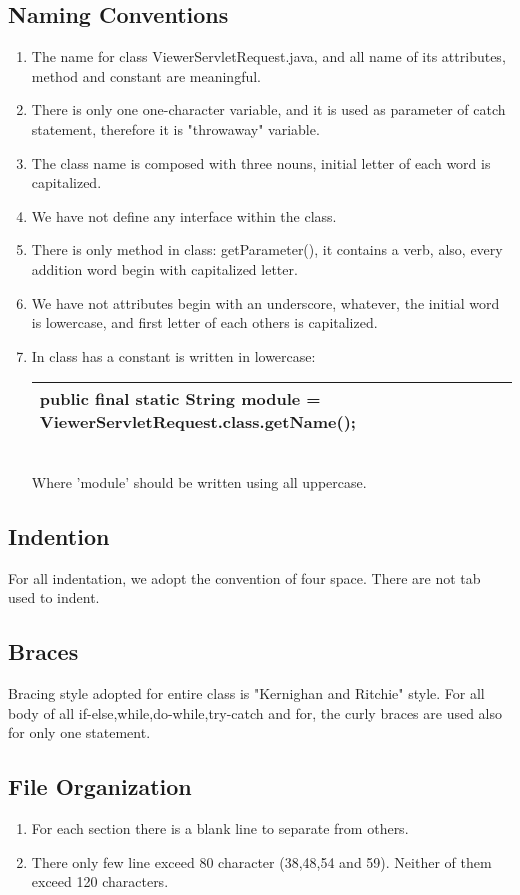 \documentclass{article}
\begin{document}
\subsection{Naming Conventions}
\begin{enumerate}
\item 
The name for class ViewerServletRequest.java, and all name of its attributes, method and constant are meaningful.
\item
There is only one one-character variable, and it is used as parameter of catch statement, therefore it is "throwaway" variable.
\item
The class name is composed with three nouns, initial letter of each word is capitalized.
\item
We have not define any interface within the class.
\item 
There is only method in class: getParameter(), it contains a verb, also, every addition word begin with capitalized letter.
\item
We have not attributes begin with an underscore, whatever, the initial word is lowercase, and first letter of each others is capitalized.
\item
In class has a constant is written in lowercase:
\begin{table}[hpb]
\label{my-label}
\begin{tabular}{|l|}
\hline
public final static String module = ViewerServletRequest.class.getName();\\
\hline
\end{tabular}
\end{table} 
\\Where 'module' should be written using all uppercase.
\end{enumerate}

\subsection{Indention}
For all indentation, we adopt the convention of four space. There are not tab used to indent. 
\subsection{Braces}
Bracing style adopted for entire class is "Kernighan and Ritchie" style. For all body of all if-else,while,do-while,try-catch and for, the curly braces are used also for only one statement.
\subsection{File Organization}
\begin{enumerate}
\item
For each section there is a blank line to separate from others.
\item
There only few line exceed 80 character (38,48,54 and 59). Neither of them exceed 120 characters.
\end{enumerate}
\end{document}
